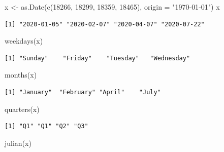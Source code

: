 \documentclass[
]{book}
\newenvironment{Shaded}{\begin{snugshade}}{\end{snugshade}}
\newcommand{\AttributeTok}[1]{\textcolor[rgb]{0.77,0.63,0.00}{#1}}
\newcommand{\DecValTok}[1]{\textcolor[rgb]{0.00,0.00,0.81}{#1}}
\newcommand{\FunctionTok}[1]{\textcolor[rgb]{0.00,0.00,0.00}{#1}}
\newcommand{\NormalTok}[1]{#1}
\newcommand{\OtherTok}[1]{\textcolor[rgb]{0.56,0.35,0.01}{#1}}
\newcommand{\StringTok}[1]{\textcolor[rgb]{0.31,0.60,0.02}{#1}}
\begin{document}
\begin{Shaded}
\begin{Highlighting}[]
\NormalTok{x }\OtherTok{\textless{}{-}} \FunctionTok{as.Date}\NormalTok{(}\FunctionTok{c}\NormalTok{(}\DecValTok{18266}\NormalTok{, }\DecValTok{18299}\NormalTok{, }\DecValTok{18359}\NormalTok{, }\DecValTok{18465}\NormalTok{), }\AttributeTok{origin =} \StringTok{"1970{-}01{-}01"}\NormalTok{)}
\NormalTok{x}
\end{Highlighting}
\end{Shaded}

\begin{verbatim}
[1] "2020-01-05" "2020-02-07" "2020-04-07" "2020-07-22"
\end{verbatim}

\begin{Shaded}
\begin{Highlighting}[]
\FunctionTok{weekdays}\NormalTok{(x)}
\end{Highlighting}
\end{Shaded}

\begin{verbatim}
[1] "Sunday"    "Friday"    "Tuesday"   "Wednesday"
\end{verbatim}

\begin{Shaded}
\begin{Highlighting}[]
\FunctionTok{months}\NormalTok{(x)}
\end{Highlighting}
\end{Shaded}

\begin{verbatim}
[1] "January"  "February" "April"    "July"    
\end{verbatim}

\begin{Shaded}
\begin{Highlighting}[]
\FunctionTok{quarters}\NormalTok{(x)}
\end{Highlighting}
\end{Shaded}

\begin{verbatim}
[1] "Q1" "Q1" "Q2" "Q3"
\end{verbatim}

\begin{Shaded}
\begin{Highlighting}[]
\FunctionTok{julian}\NormalTok{(x)}
\end{Highlighting}
\end{Shaded}
\end{document}

